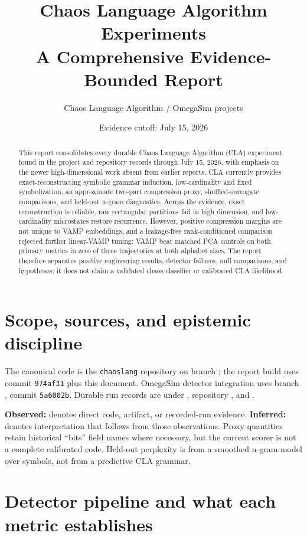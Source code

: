 \documentclass[11pt]{article}
\title{Chaos Language Algorithm Experiments\\A Comprehensive Evidence-Bounded Report}
\author{Chaos Language Algorithm / OmegaSim projects}
\date{Evidence cutoff: July 15, 2026}
\newcommand{\observed}{\textbf{Observed:}}
\newcommand{\inferred}{\textbf{Inferred:}}
\begin{document}
\maketitle

\begin{abstract}
This report consolidates every durable Chaos Language Algorithm (CLA)
experiment found in the project and repository records through July 15, 2026,
with emphasis on the newer high-dimensional work absent from earlier reports.
CLA currently provides exact-reconstructing symbolic grammar induction,
low-cardinality and fixed symbolization, an approximate two-part compression
proxy, shuffled-surrogate comparisons, and held-out n-gram diagnostics. Across
the evidence, exact reconstruction is reliable, raw rectangular partitions
fail in high dimension, and low-cardinality microstates restore recurrence.
However, positive compression margins are not unique to VAMP embeddings, and a
leakage-free rank-conditioned comparison rejected further linear-VAMP tuning:
VAMP beat matched PCA controls on both primary metrics in zero of three
trajectories at both alphabet sizes. The report therefore separates positive
engineering results, detector failures, null comparisons, and hypotheses; it
does not claim a validated chaos classifier or calibrated CLA likelihood.
\end{abstract}

\section{Scope, sources, and epistemic discipline}

The canonical code is the \texttt{chaoslang} repository on branch
; the report build uses commit \texttt{974af31}
plus this document. OmegaSim detector integration uses branch
, commit \texttt{5a6002b}. Durable run records
are under , repository
, and .

\observed{} denotes direct code, artifact, or recorded-run evidence.
\inferred{} denotes interpretation that follows from those observations.
Proxy quantities retain historical ``bits'' field names where necessary, but
the current scorer is not a complete calibrated code. Held-out perplexity is
from a smoothed n-gram model over symbols, not from a predictive CLA grammar.

\section{Detector pipeline and what each metric establishes}
\end{document}

